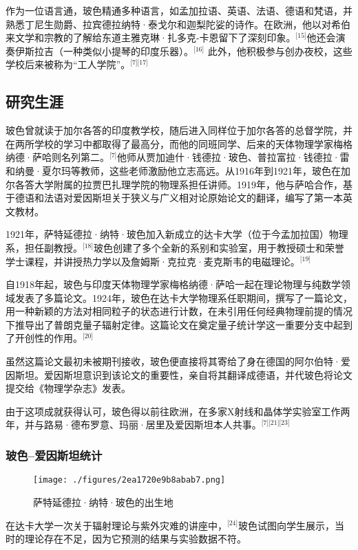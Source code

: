作为一位语言通，玻色精通多种语言，如孟加拉语、英语、法语、德语和梵语，并熟悉丁尼生勋爵、拉宾德拉纳特·泰戈尔和迦梨陀娑的诗作。在欧洲，他以对希伯来文学和宗教的了解给东道主雅克琳·扎多克-卡恩留下了深刻印象。\(^\text{[15]}\)他还会演奏伊斯拉吉（一种类似小提琴的印度乐器）。\(^\text{[16]}\) 此外，他积极参与创办夜校，这些学校后来被称为“工人学院”。\(^\text{[7][17]}\)
\subsection{研究生涯}
玻色曾就读于加尔各答的印度教学校，随后进入同样位于加尔各答的总督学院，并在两所学校的学习中都取得了最高分，而他的同班同学、后来的天体物理学家梅格纳德·萨哈则名列第二。\(^\text{[7]}\)他师从贾加迪什·钱德拉·玻色、普拉富拉·钱德拉·雷和纳曼·夏尔玛等教师，这些老师激励他立志高远。从1916年到1921年，玻色在加尔各答大学附属的拉贾巴扎理学院的物理系担任讲师。1919年，他与萨哈合作，基于德语和法语对爱因斯坦关于狭义与广义相对论原始论文的翻译，编写了第一本英文教材。

1921年，萨特延德拉·纳特·玻色加入新成立的达卡大学（位于今孟加拉国）物理系，担任副教授。\(^\text{[18]}\)玻色创建了多个全新的系别和实验室，用于教授硕士和荣誉学士课程，并讲授热力学以及詹姆斯·克拉克·麦克斯韦的电磁理论。\(^\text{[19]}\)

自1918年起，玻色与印度天体物理学家梅格纳德·萨哈一起在理论物理与纯数学领域发表了多篇论文。1924年，玻色在达卡大学物理系任职期间，撰写了一篇论文，用一种新颖的方法对相同粒子的状态进行计数，在未引用任何经典物理前提的情况下推导出了普朗克量子辐射定律。这篇论文在奠定量子统计学这一重要分支中起到了开创性的作用。\(^\text{[20]}\)

虽然这篇论文最初未被期刊接收，玻色便直接将其寄给了身在德国的阿尔伯特·爱因斯坦。爱因斯坦意识到该论文的重要性，亲自将其翻译成德语，并代玻色将论文提交给《物理学杂志》发表。

由于这项成就获得认可，玻色得以前往欧洲，在多家X射线和晶体学实验室工作两年，并与路易·德布罗意、玛丽·居里及爱因斯坦本人共事。\(^\text{[7][21][23]}\)
\subsubsection{玻色–爱因斯坦统计}
\begin{figure}[ht]
\centering
\texttt{[image: ./figures/2ea1720e9b8abab7.png]}
\caption{萨特延德拉·纳特·玻色的出生地} \label{fig_BOSE_1}
\end{figure}
在达卡大学一次关于辐射理论与紫外灾难的讲座中，\(^\text{[24]}\)玻色试图向学生展示，当时的理论存在不足，因为它预测的结果与实验数据不符。

